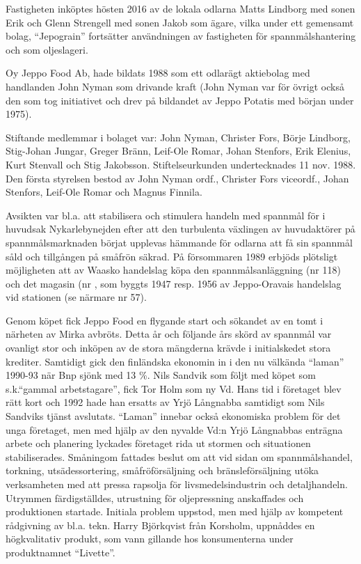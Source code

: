 





Fastigheten inköptes hösten 2016 av de lokala odlarna Matts Lindborg med sonen Erik och Glenn Strengell med sonen Jakob som ägare, vilka under ett gemensamt bolag, ``Jepograin'' fortsätter användningen av fastigheten för spannmålshantering och som oljeslageri.



Oy Jeppo Food Ab, hade bildats 1988 som ett odlarägt aktiebolag med handlanden John Nyman som drivande kraft (John Nyman var för övrigt också den som tog initiativet och drev på bildandet av Jeppo Potatis med början under 1975).

Stiftande medlemmar i bolaget var: John Nyman, Christer Fors, Börje Lindborg, Stig-Johan Jungar, Greger Bränn, Leif-Ole Romar, Johan Stenfors, Erik Elenius, Kurt Stenvall och Stig Jakobsson. Stiftelseurkunden undertecknades 11 nov. 1988. Den första styrelsen bestod av John Nyman ordf., Christer Fors viceordf., Johan Stenfors, Leif-Ole Romar och Magnus Finnila.

Avsikten var bl.a. att stabilisera och stimulera handeln med spannmål för i huvudsak Nykarlebynejden efter att den turbulenta växlingen av huvudaktörer på spannmålsmarknaden börjat upplevas hämmande för odlarna att få sin spannmål såld och tillgången på småfrön säkrad. På försommaren 1989 erbjöds plötsligt möjligheten att av Waasko handelslag köpa den spannmålsanläggning (nr 118) och det magasin (nr , som byggts 1947 resp. 1956 av Jeppo-Oravais handelslag vid stationen (se närmare nr 57).

Genom köpet fick Jeppo Food en flygande start och sökandet av en tomt i närheten av Mirka avbröts. Detta år och följande års skörd av spannmål var ovanligt stor och inköpen av de stora mängderna krävde i initialskedet stora krediter. Samtidigt gick den finländska  ekonomin in i den nu välkända ``laman'' 1990-93 när Bnp sjönk med 13 \%.  Nils Sandvik som följt med köpet som s.k.``gammal arbetstagare'', fick Tor Holm som ny Vd. Hans tid i företaget blev rätt kort och 1992 hade han ersatts av Yrjö Långnabba samtidigt som Nils Sandviks tjänst avslutats. ``Laman'' innebar också ekonomiska problem för det unga företaget, men med hjälp av den nyvalde Vd:n Yrjö Långnabbas enträgna arbete och planering lyckades företaget rida ut stormen och situationen stabiliserades. Småningom fattades beslut om att vid sidan om spannmålshandel, torkning, utsädessortering, småfröförsäljning och bränsleförsäljning utöka verksamheten med att pressa rapsolja för livsmedelsindustrin och detaljhandeln. Utrymmen färdigställdes, utrustning för oljepressning anskaffades och produktionen startade. Initiala problem uppstod, men med hjälp av kompetent rådgivning av bl.a. tekn. Harry Björkqvist från Korsholm, uppnåddes en högkvalitativ produkt, som vann gillande hos konsumenterna under produktnamnet ``Livette''.

